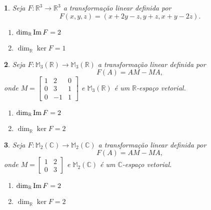 \documentclass[12pt]{exam}
\newtheorem{exercicio}{}
\newcommand{\im}{{\rm Im\,}}
\newcommand{\real}{\mathbb{R}}
\newcommand{\complex}{\mathbb{C}}
\newcommand{\cp}[1]{\mathbb{#1}}
\begin{document}
\begin{exercicio}
  Seja $F : \real^3 \to \real^3$ a transforma\c{c}\~ao linear definida por
  \[
    F(x,y,z) = (x + 2y - z, y + z, x + y - 2z).
  \]
  \begin{solucao}
    \begin{enumerate}[label=({\alph*})]
      \item $\dim_\real\im F = 2$
      \item $\dim_\real\ker F = 1$
    \end{enumerate}
  \end{solucao}
\end{exercicio}

\begin{exercicio}
  Seja $F : \cp{M}_3(\real) \to \cp{M}_3(\real)$ a transforma\c{c}\~ao linear definida por
  \[
    F(A) = AM - MA,
  \]
  onde $M = \begin{bmatrix}
    1 & 2 & 0\\0 & 3 & 1\\0 & -1 & 1
  \end{bmatrix}$ e $\cp{M}_3(\real)$ \'e um $\real$-espa\c{c}o vetorial.
  \begin{solucao}
    \begin{enumerate}[label=({\alph*})]
      \item $\dim_\real\im F = 2$
      \item $\dim_\real\ker F = 2$
    \end{enumerate}
  \end{solucao}
\end{exercicio}

\begin{exercicio}\label{nucleo_imagem_fim}
  Seja $F : \cp{M}_2(\complex) \to \cp{M}_2(\complex)$ a transforma\c{c}\~ao linear definida por
  \[
    F(A) = AM - MA,
  \]
  onde $M = \begin{bmatrix}
    1 & 2\\0 & 3
  \end{bmatrix}$ e $\cp{M}_2(\complex)$ \'e um $\complex$-espa\c{c}o vetorial.
  \begin{solucao}
    \begin{enumerate}[label=({\alph*})]
      \item $\dim_\real\im F = 2$
      \item $\dim_\real\ker F = 2$
    \end{enumerate}
  \end{solucao}
\end{exercicio}
\end{document}
